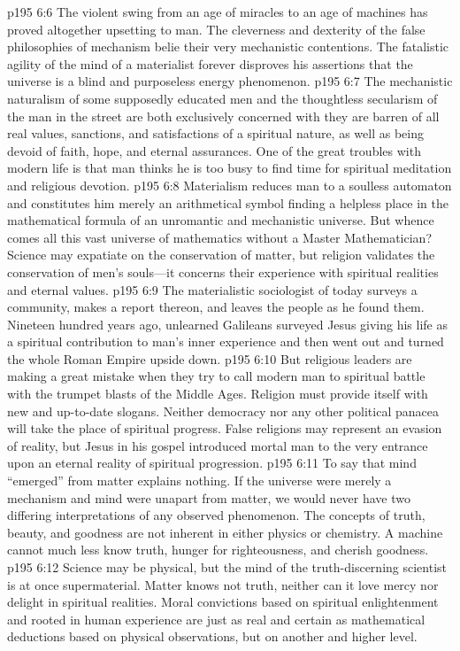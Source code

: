\vs p195 6:6 The violent swing from an age of miracles to an age of machines has proved altogether upsetting to man. The cleverness and dexterity of the false philosophies of mechanism belie their very mechanistic contentions. The fatalistic agility of the mind of a materialist forever disproves his assertions that the universe is a blind and purposeless energy phenomenon.
\vs p195 6:7 The mechanistic naturalism of some supposedly educated men and the thoughtless secularism of the man in the street are both exclusively concerned with  they are barren of all real values, sanctions, and satisfactions of a spiritual nature, as well as being devoid of faith, hope, and eternal assurances. One of the great troubles with modern life is that man thinks he is too busy to find time for spiritual meditation and religious devotion.
\vs p195 6:8 Materialism reduces man to a soulless automaton and constitutes him merely an arithmetical symbol finding a helpless place in the mathematical formula of an unromantic and mechanistic universe. But whence comes all this vast universe of mathematics without a Master Mathematician? Science may expatiate on the conservation of matter, but religion validates the conservation of men’s souls---it concerns their experience with spiritual realities and eternal values.
\vs p195 6:9 The materialistic sociologist of today surveys a community, makes a report thereon, and leaves the people as he found them. Nineteen hundred years ago, unlearned Galileans surveyed Jesus giving his life as a spiritual contribution to man’s inner experience and then went out and turned the whole Roman Empire upside down.
\vs p195 6:10 But religious leaders are making a great mistake when they try to call modern man to spiritual battle with the trumpet blasts of the Middle Ages. Religion must provide itself with new and up\hyp{}to\hyp{}date slogans. Neither democracy nor any other political panacea will take the place of spiritual progress. False religions may represent an evasion of reality, but Jesus in his gospel introduced mortal man to the very entrance upon an eternal reality of spiritual progression.
\vs p195 6:11 To say that mind “emerged” from matter explains nothing. If the universe were merely a mechanism and mind were unapart from matter, we would never have two differing interpretations of any observed phenomenon. The concepts of truth, beauty, and goodness are not inherent in either physics or chemistry. A machine cannot  much less know truth, hunger for righteousness, and cherish goodness.
\vs p195 6:12 Science may be physical, but the mind of the truth\hyp{}discerning scientist is at once supermaterial. Matter knows not truth, neither can it love mercy nor delight in spiritual realities. Moral convictions based on spiritual enlightenment and rooted in human experience are just as real and certain as mathematical deductions based on physical observations, but on another and higher level.
